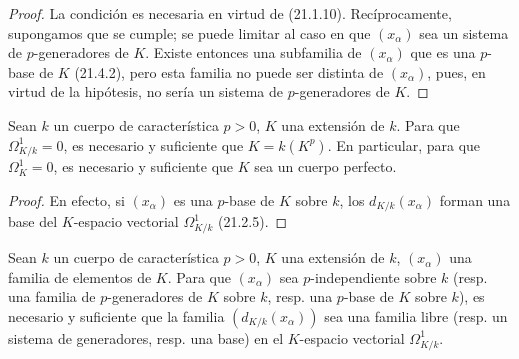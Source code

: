 \begin{proof}
La condición es necesaria en virtud de (21.1.10). Recíprocamente, supongamos que se
cumple; se puede limitar al caso en que $(x_\alpha)$ sea un sistema de
$p$-generadores de $K$. Existe entonces una subfamilia de $(x_\alpha)$ que es una
$p$-base de $K$ (21.4.2), pero esta familia no puede ser distinta de $(x_\alpha)$,
pues, en virtud de la hipótesis, no sería un sistema de $p$-generadores de $K$.
\end{proof}


\begin{corollary}[21.4.4]
\label{0.21.4.4-fr}
Sean $k$ un cuerpo de característica $p>0$, $K$ una extensión de $k$.
Para que $\Omega^1_{K/k}=0$, es necesario y suficiente que $K=k(K^p)$.
En particular, para que $\Omega^1_K=0$, es necesario y suficiente que $K$ sea
un cuerpo perfecto.
\end{corollary}

\begin{proof}
En efecto, si $(x_\alpha)$ es una $p$-base de $K$ sobre $k$, los
$d_{K/k}(x_\alpha)$ forman una base del $K$-espacio vectorial $\Omega^1_{K/k}$
(21.2.5).
\end{proof}

\begin{theorem}[21.4.5]
\label{0.21.4.5-fr}
Sean $k$ un cuerpo de característica $p>0$, $K$ una extensión de $k$,
$(x_\alpha)$ una familia de elementos de $K$. Para que $(x_\alpha)$ sea
$p$-independiente sobre $k$ (\textup{resp.} una familia de $p$-generadores de $K$ sobre $k$,
\textup{resp.} una $p$-base de $K$ sobre $k$), es necesario y suficiente que la familia
$(d_{K/k}(x_\alpha))$ sea una familia libre (\textup{resp.} un sistema de
generadores, \textup{resp.} una base) en el $K$-espacio vectorial $\Omega^1_{K/k}$.
\end{theorem}

